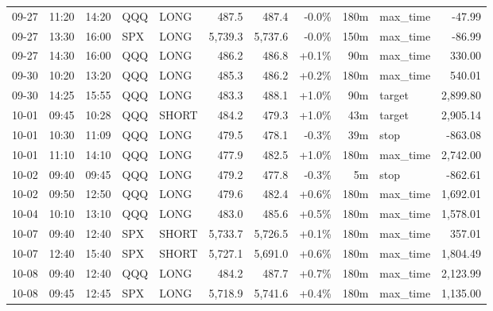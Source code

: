 \documentclass[11pt,a4paper,twoside]{article}
\begin{document}
\begin{center}
\begin{longtable}{>{\color{txtmain}}l l l l l r r r r >{\color{txtmain}}l r}
09-27 & 11:20 & 14:20 & QQQ & LONG & 487.5 & 487.4 & \textcolor{lossred}{-0.0\%} & 180m & max\_time & \textcolor{lossred}{-47.99} \\
09-27 & 13:30 & 16:00 & SPX & LONG & 5,739.3 & 5,737.6 & \textcolor{lossred}{-0.0\%} & 150m & max\_time & \textcolor{lossred}{-86.99} \\
09-27 & 14:30 & 16:00 & QQQ & LONG & 486.2 & 486.8 & \textcolor{wingreen}{+0.1\%} & 90m & max\_time & \textcolor{wingreen}{330.00} \\
09-30 & 10:20 & 13:20 & QQQ & LONG & 485.3 & 486.2 & \textcolor{wingreen}{+0.2\%} & 180m & max\_time & \textcolor{wingreen}{540.01} \\
09-30 & 14:25 & 15:55 & QQQ & LONG & 483.3 & 488.1 & \textcolor{wingreen}{+1.0\%} & 90m & target & \textcolor{wingreen}{2,899.80} \\
10-01 & 09:45 & 10:28 & QQQ & SHORT & 484.2 & 479.3 & \textcolor{wingreen}{+1.0\%} & 43m & target & \textcolor{wingreen}{2,905.14} \\
10-01 & 10:30 & 11:09 & QQQ & LONG & 479.5 & 478.1 & \textcolor{lossred}{-0.3\%} & 39m & stop & \textcolor{lossred}{-863.08} \\
10-01 & 11:10 & 14:10 & QQQ & LONG & 477.9 & 482.5 & \textcolor{wingreen}{+1.0\%} & 180m & max\_time & \textcolor{wingreen}{2,742.00} \\
10-02 & 09:40 & 09:45 & QQQ & LONG & 479.2 & 477.8 & \textcolor{lossred}{-0.3\%} & 5m & stop & \textcolor{lossred}{-862.61} \\
10-02 & 09:50 & 12:50 & QQQ & LONG & 479.6 & 482.4 & \textcolor{wingreen}{+0.6\%} & 180m & max\_time & \textcolor{wingreen}{1,692.01} \\
10-04 & 10:10 & 13:10 & QQQ & LONG & 483.0 & 485.6 & \textcolor{wingreen}{+0.5\%} & 180m & max\_time & \textcolor{wingreen}{1,578.01} \\
10-07 & 09:40 & 12:40 & SPX & SHORT & 5,733.7 & 5,726.5 & \textcolor{wingreen}{+0.1\%} & 180m & max\_time & \textcolor{wingreen}{357.01} \\
10-07 & 12:40 & 15:40 & SPX & SHORT & 5,727.1 & 5,691.0 & \textcolor{wingreen}{+0.6\%} & 180m & max\_time & \textcolor{wingreen}{1,804.49} \\
10-08 & 09:40 & 12:40 & QQQ & LONG & 484.2 & 487.7 & \textcolor{wingreen}{+0.7\%} & 180m & max\_time & \textcolor{wingreen}{2,123.99} \\
10-08 & 09:45 & 12:45 & SPX & LONG & 5,718.9 & 5,741.6 & \textcolor{wingreen}{+0.4\%} & 180m & max\_time & \textcolor{wingreen}{1,135.00} \\

\end{longtable}
\end{center}
\end{document}
